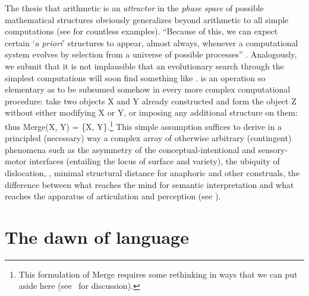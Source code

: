 \documentclass[output=paper]{langsci/langscibook}
\begin{document}
The thesis that arithmetic is an \emph{attractor} in the \emph{phase}
\emph{space} of possible mathematical structures obviously generalizes beyond
arithmetic to all simple computations (see \citealt{Wolfram2002} for countless
examples). “Because of this, we can expect certain ‘\emph{a} \emph{priori}’
structures to appear, almost always, whenever a computational system evolves by
selection from a universe of possible processes” \citep[119]{Minsky1985}.
Analogously, we submit that it is not implausible that an evolutionary search
through the simplest computations will soon find something like .  is
an operation so elementary as to be subsumed somehow in every more complex
computational procedure: take two objects X and Y already constructed and form
the object Z without either modifying X or Y, or imposing any additional
structure on them: thus Merge(X, Y) = \{X, Y\}.\footnote{This formulation of
Merge requires some rethinking in ways that we can put aside here
(see~\citealt{Chomskyfc} for discussion).} This simple assumption suffices to derive in a
principled (necessary) way a complex array of otherwise arbitrary (contingent)
phenomena such as the asymmetry of the conceptual-intentional and sensory-motor
interfaces (entailing the locus of surface  and variety), the
ubiquity of dislocation, , minimal structural distance for
anaphoric and other construals, the difference between what reaches the mind
for semantic interpretation and what reaches the apparatus of articulation and
perception (see \citealt{Chomsky2017}).

\section{The dawn of language}
\end{document}
